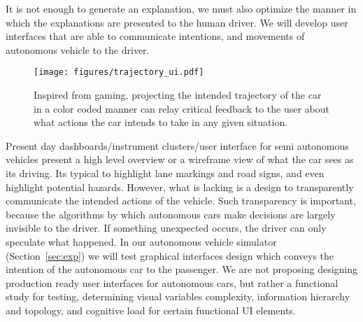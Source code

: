 It is not enough to generate an explanation, we must also optimize the manner in which the explanations are presented to the human driver. 
We will develop user interfaces that are able to communicate intentions, and movements of autonomous vehicle to the driver.
\begin{wrapfigure}{r}{0.4\textwidth}
\vspace{-15pt}
  \begin{center}
    \texttt{[image: figures/trajectory\_ui.pdf]}
  \end{center}
  \vspace{-15pt}
  \caption{Inspired from gaming, projecting the intended trajectory of the car in a color coded manner can relay critical feedback to the user about what actions the car intends to take in any given situation.}
  \label{fig:trajectory}
\end{wrapfigure}
Present day dashboards/instrument clusters/user interface for semi autonomous vehicles present a high level overview or a wireframe view of what the car sees as its driving. Its typical to highlight lane markings and road signs, and even highlight potential hazards.
However, what is lacking is a design to transparently communicate the intended actions of the vehicle. 
Such transparency is important, because the algorithms by which autonomous cars make decisions are largely invisible to the driver.
If something unexpected occurs, the driver can only speculate what happened. 
In our autonomous vehicle simulator (Section~\ref{sec:exp}) we will test graphical interfaces design which conveys the intention of the autonomous car to the passenger. 
We are not proposing designing production ready user interfaces for autonomous cars, but rather a functional study for testing, determining visual variables complexity, information hierarchy and topology, and cognitive load for certain functional UI elements. 
